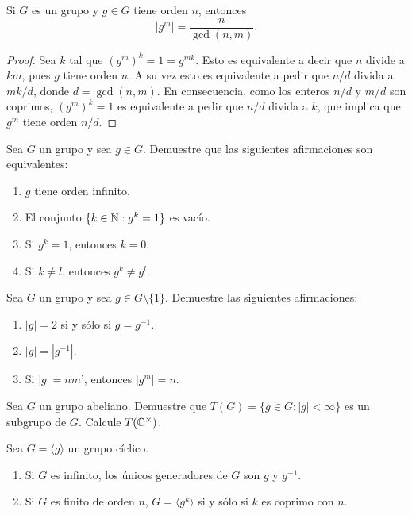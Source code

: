 \begin{corollary}
Si $G$ es un grupo y $g\in G$ tiene orden $n$, entonces 
\[
|g^m|=\frac{n}{\gcd(n,m)}.
\]		
\end{corollary}

\begin{proof}
Sea $k$ tal que $(g^m)^k=1=g^{mk}$. Esto es equivalente a decir que $n$ divide a $km$, pues $g$ tiene orden $n$. A su vez esto 
es equivalente a pedir que    
$n/d$ divida a $mk/d$, donde $d=\gcd(n,m)$. En consecuencia, como los enteros $n/d$ y $m/d$ son coprimos, $(g^m)^k=1$ es equivalente a pedir que $n/d$ divida a $k$, que implica que $g^m$ tiene orden $n/d$.  
\end{proof}

\begin{exercise}
Sea $G$ un grupo y sea $g\in G$. Demuestre que las siguientes afirmaciones son equivalentes:
\begin{enumerate}
\item $g$ tiene orden infinito.
\item El conjunto $\{k\in\mathbb{N}:g^k=1\}$ es vacío. 
\item Si $g^k=1$, entonces $k=0$.
\item Si $k\ne l$, entonces $g^k\ne g^l$.  	
\end{enumerate}
\end{exercise}

\begin{exercise}
Sea $G$ un grupo y sea $g\in G\setminus\{1\}$. Demuestre las siguientes afirmaciones: 
\begin{enumerate}
\item $|g|=2$ si y sólo si $g=g^{-1}$.
\item $|g|=|g^{-1}|$. 
\item Si $|g|=nm$', entonces $|g^m|=n$.  
\end{enumerate}	
\end{exercise}

\begin{exercise}
	Sea $G$ un grupo abeliano. Demuestre que $T(G)=\{g\in G:|g|<\infty\}$ es un subgrupo de $G$. Calcule $T(\mathbb{C}^\times)$. 
\end{exercise}

\begin{exercise}
	Sea $G=\langle g\rangle$ un grupo cíclico. 
	\begin{enumerate}
		\item Si $G$ es infinito, los únicos generadores de $G$ son $g$ y $g^{-1}$.
		\item Si $G$ es finito de orden $n$, $G=\langle g^k\rangle$ si y sólo
			si $k$ es coprimo con $n$.
	\end{enumerate}
\end{exercise}

